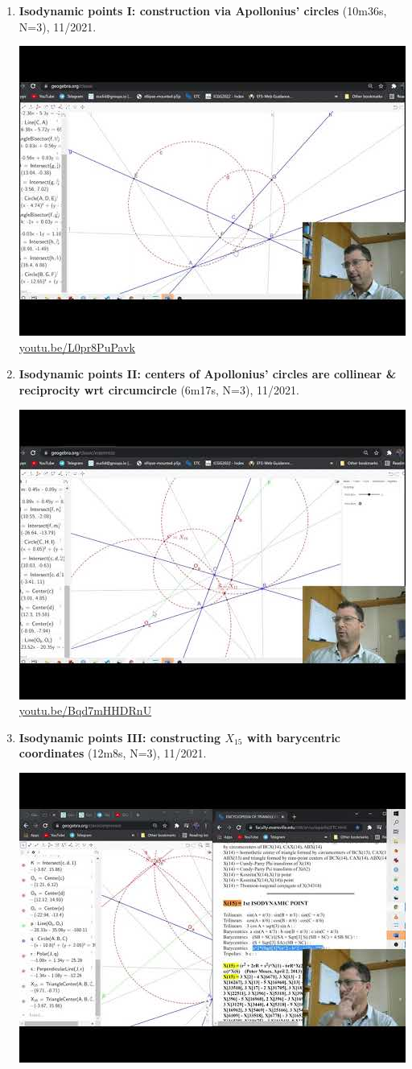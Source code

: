 \documentclass[12pt]{amsart}
\begin{document}
\begin{enumerate}[resume]
\item \textbf{Isodynamic points I: construction via Apollonius' circles} (10m36s, N=3), 11/2021. 
\begin{center}\includegraphics[width=.5\textwidth]{pics/L0pr8PuPavk.jpg} \\ 
\href{https://youtu.be/L0pr8PuPavk}{\url{youtu.be/L0pr8PuPavk}}\end{center}
% 
\item \textbf{Isodynamic points II: centers of Apollonius' circles are collinear \& reciprocity wrt circumcircle} (6m17s, N=3), 11/2021. 
\begin{center}\includegraphics[width=.5\textwidth]{pics/Bqd7mHHDRnU.jpg} \\ 
\href{https://youtu.be/Bqd7mHHDRnU}{\url{youtu.be/Bqd7mHHDRnU}}\end{center}
% 
\item \textbf{Isodynamic points III: constructing $X_{15}$ with barycentric coordinates} (12m8s, N=3), 11/2021. 
\begin{center}\includegraphics[width=.5\textwidth]{pics/uUSKWHrctOQ.jpg} \\ 

\end{center}
\end{enumerate}
\end{document}
